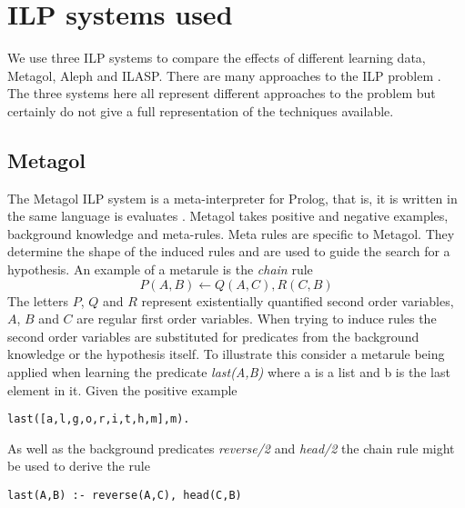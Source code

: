 \section{ILP systems used}
We use three ILP systems to compare the effects of different learning data, Metagol, Aleph and ILASP. There are many approaches to the ILP problem \cite{Svetla/ILPOverview,Cropper/NewIdeas}. The three systems here all represent different approaches to the problem but certainly do not give a full representation of the techniques available.
\subsection{Metagol}
The Metagol ILP system is a meta-interpreter for Prolog, that is, it is written in the same language is evaluates \cite{Cropper/Thesis,Rolf/Metagol,Metagol/Github}. Metagol takes positive and negative examples, background knowledge and meta-rules. Meta rules are specific to Metagol. They determine the shape of the induced rules and are used to guide the search for a hypothesis. An example of a metarule is the \textit{chain} rule \[P(A,B) \leftarrow Q(A,C),R(C,B)\] The letters $P$, $Q$ and $R$ represent existentially quantified second order variables, $A$, $B$ and $C$ are regular first order variables. When trying to induce rules the second order variables are substituted for predicates from the background knowledge or the hypothesis itself. To illustrate this consider a metarule being applied when learning the predicate \textit{last(A,B)} where a is a list and b is the last element in it. Given the positive example
\begin{verbatim}
last([a,l,g,o,r,i,t,h,m],m).
\end{verbatim}

As well as the background predicates \textit{reverse/2} and \textit{head/2} the chain rule might be used to derive the rule
\begin{verbatim}
last(A,B) :- reverse(A,C), head(C,B)
\end{verbatim}

